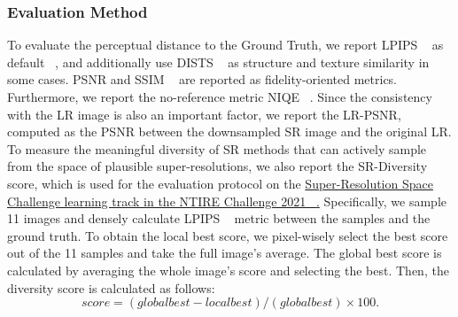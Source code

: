 \documentclass{article}
\begin{document}
\subsubsection{Evaluation Method} 
To evaluate the perceptual distance to the Ground Truth, we report LPIPS ~\cite{zhang2018unreasonable} as default ~\cite{lugmayr2019unsupervise}, and additionally use DISTS ~\cite{ding2020image} as structure and texture similarity in some cases. PSNR and SSIM ~\cite{wang2004image} are reported as fidelity-oriented metrics. Furthermore, we report the no-reference metric NIQE ~\cite{zhang2018unreasonable}. Since the consistency with the LR image is also an important factor, we report the LR-PSNR, computed as the PSNR between the downsampled SR image and the original LR. To measure the meaningful diversity of SR methods that can actively sample from the space of plausible super-resolutions, we also report the SR-Diversity score, which is used for the evaluation protocol on the \href{https://github.com/andreas128/NTIRE21_Learning_SR_Space}{Super-Resolution Space Challenge learning track in the NTIRE Challenge 2021 ~\cite{SRSpace2021, Lugmayr_2021_CVPR}.} Specifically, we sample 11 images and densely calculate LPIPS ~\cite{zhang2018unreasonable} metric between the samples and the ground truth. To obtain the local best score, we pixel-wisely select the best score out of the 11 samples and take the full image's average. The global best score is calculated by averaging the whole image's score and selecting the best. Then, the diversity score is calculated as follows:
\begin{equation}
score = (global best - local best)/(global best) \times 100.
\label{eqn:div_score}
\end{equation}
\end{document}
